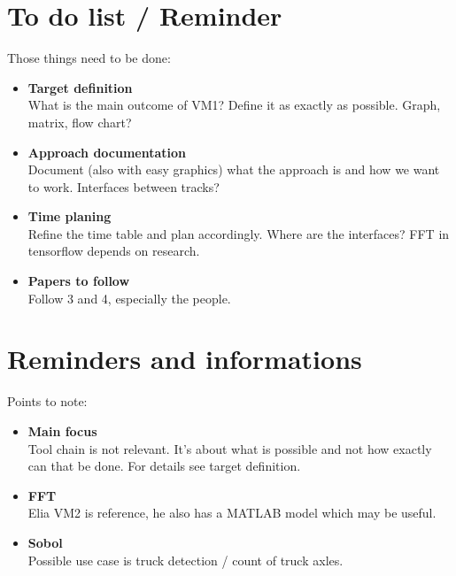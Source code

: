 \section*{To do list / Reminder}
Those things need to be done:

\begin{itemize}
	\item \textbf{Target definition} \\
	What is the main outcome of VM1? Define it as exactly as possible. Graph, matrix, flow chart?
	\item \textbf{Approach documentation} \\
	Document (also with easy graphics) what the approach is and how we want to work. Interfaces between tracks?
	\item \textbf{Time planing} \\
	Refine the time table and plan accordingly. Where are the interfaces? FFT in tensorflow depends on research. 
	\item \textbf{Papers to follow} \\
	Follow 3 and 4, especially the people.
\end{itemize}

\section*{Reminders and informations}
Points to note:

\begin{itemize}
	\item \textbf{Main focus} \\
	Tool chain is not relevant. It's about what is possible and not how exactly can that be done. For details see target definition.
	\item \textbf{FFT} \\
	Elia VM2 is reference, he also has a MATLAB model which may be useful.
	\item \textbf{Sobol} \\
	Possible use case is truck detection / count of truck axles.
\end{itemize}